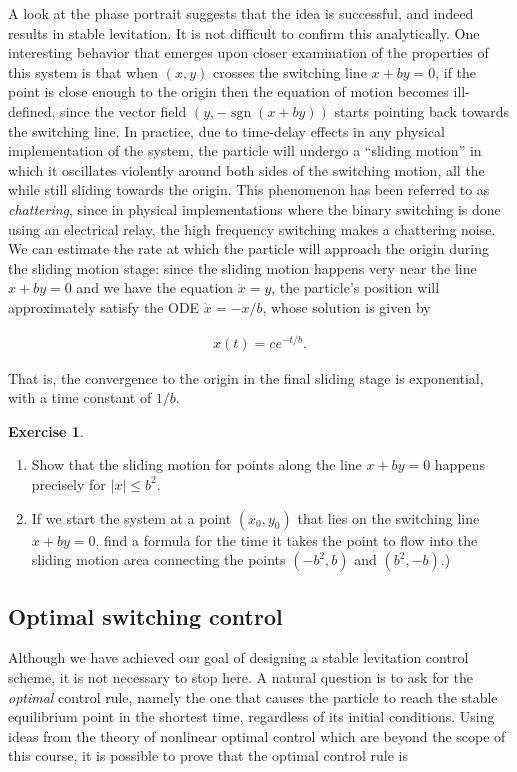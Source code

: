 \documentclass[11pt]{report}
\theoremstyle{plain}
\theoremstyle{definition}
\newtheorem{xexercise}[thm]{Exercise}
\begin{document}
A look at the phase portrait suggests that the idea
is successful, and indeed results in stable
levitation. It is not difficult to confirm this
analytically. One interesting behavior that emerges
upon closer examination of the properties of this
system is that when $(x,y)$ crosses the switching
line $x+by=0$, if the point is close enough to the
origin then the equation of motion becomes
ill-defined, since the vector field
$(y,-\operatorname{sgn}(x+by))$ starts pointing back
towards the switching line. In practice, due to
time-delay effects in any physical implementation of
the system, the particle will undergo a ``sliding
motion'' in which it oscillates violently around both
sides of the switching motion, all the while still
sliding towards the origin. This phenomenon has been
referred to as \emph{chattering}, since in physical
implementations where the binary switching is done
using an electrical relay, the high frequency
switching makes a chattering noise. We can estimate
the rate at which the particle will approach the
origin during the sliding motion stage: since the
sliding motion happens very near the line $x+by=0$
and we have the equation $\dot{x}=y$, the particle's
position will approximately satisfy the ODE
$\dot{x}=-x/b$, whose solution is given by

\begin{align*}
x(t) = c e^{-t/b}.
\end{align*}

That is, the convergence to the origin in the final
sliding stage is exponential, with a time constant of
$1/b$.

\begin{xexercise}

\begin{enumerate}[label=\arabic*.]
\item Show that the sliding motion for points along the
line $x+by=0$ happens precisely for $|x|\le b^2$.

\item If we start the system at a point $(x_0,y_0)$ that
lies on the switching line $x+by=0$, find a formula
for the time it takes the point to flow into the
sliding motion area connecting the points $(-b^2,b)$
and $(b^2,-b)$.)
\end{enumerate}

\end{xexercise}

\subsection{Optimal switching control}
Although we have achieved our goal of designing a
stable levitation control scheme, it is not necessary
to stop here. A natural question is to ask for the
\emph{optimal} control rule, namely the one that causes the
particle to reach the stable equilibrium point in the
shortest time, regardless of its initial conditions.
Using ideas from the theory of nonlinear optimal
control which are beyond the scope of this course, it
is possible to prove that the optimal control rule is
\end{document}
